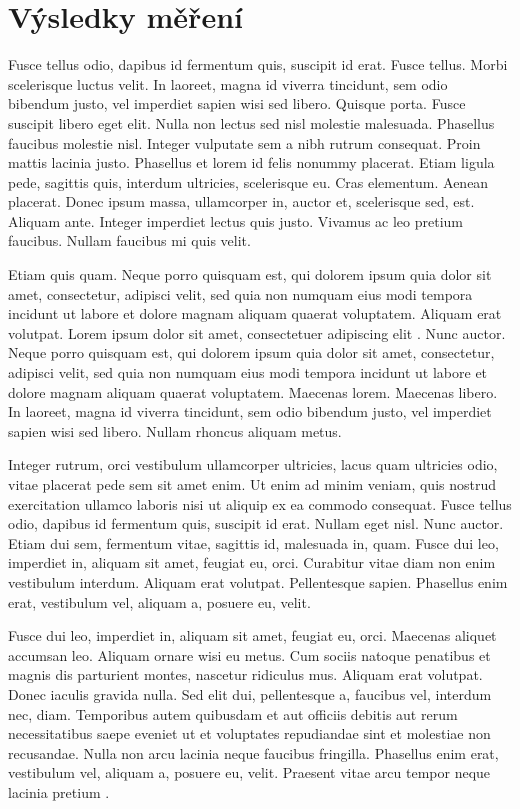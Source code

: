 \section{Výsledky měření}
Fusce tellus odio, dapibus id fermentum quis, suscipit id erat. Fusce tellus. Morbi scelerisque luctus velit. In laoreet, magna id viverra tincidunt, sem odio bibendum justo, vel imperdiet sapien wisi sed libero. Quisque porta. Fusce suscipit libero eget elit. Nulla non lectus sed nisl molestie malesuada. Phasellus faucibus molestie nisl. Integer vulputate sem a nibh rutrum consequat. Proin mattis lacinia justo. Phasellus et lorem id felis nonummy placerat. Etiam ligula pede, sagittis quis, interdum ultricies, scelerisque eu. Cras elementum. Aenean placerat. Donec ipsum massa, ullamcorper in, auctor et, scelerisque sed, est. Aliquam ante. Integer imperdiet lectus quis justo. Vivamus ac leo pretium faucibus. Nullam faucibus mi quis velit.

Etiam quis quam. Neque porro quisquam est, qui dolorem ipsum quia dolor sit amet, consectetur, adipisci velit, sed quia non numquam eius modi tempora incidunt ut labore et dolore magnam aliquam quaerat voluptatem. Aliquam erat volutpat. Lorem ipsum dolor sit amet, consectetuer adipiscing elit \cite{sr02/2009,pravidla}. Nunc auctor. Neque porro quisquam est, qui dolorem ipsum quia dolor sit amet, consectetur, adipisci velit, sed quia non numquam eius modi tempora incidunt ut labore et dolore magnam aliquam quaerat voluptatem. Maecenas lorem. Maecenas libero. In laoreet, magna id viverra tincidunt, sem odio bibendum justo, vel imperdiet sapien wisi sed libero. Nullam rhoncus aliquam metus.

Integer rutrum, orci vestibulum ullamcorper ultricies, lacus quam ultricies odio, vitae placerat pede sem sit amet enim. Ut enim ad minim veniam, quis nostrud exercitation ullamco laboris nisi ut aliquip ex ea commodo consequat. Fusce tellus odio, dapibus id fermentum quis, suscipit id erat. Nullam eget nisl. Nunc auctor. Etiam dui sem, fermentum vitae, sagittis id, malesuada in, quam. Fusce dui leo, imperdiet in, aliquam sit amet, feugiat eu, orci. Curabitur vitae diam non enim vestibulum interdum. Aliquam erat volutpat. Pellentesque sapien. Phasellus enim erat, vestibulum vel, aliquam a, posuere eu, velit.

Fusce dui leo, imperdiet in, aliquam sit amet, feugiat eu, orci. Maecenas aliquet accumsan leo. Aliquam ornare wisi eu metus. Cum sociis natoque penatibus et magnis dis parturient montes, nascetur ridiculus mus. Aliquam erat volutpat. Donec iaculis gravida nulla. Sed elit dui, pellentesque a, faucibus vel, interdum nec, diam. Temporibus autem quibusdam et aut officiis debitis aut rerum necessitatibus saepe eveniet ut et voluptates repudiandae sint et molestiae non recusandae. Nulla non arcu lacinia neque faucibus fringilla. Phasellus enim erat, vestibulum vel, aliquam a, posuere eu, velit. Praesent vitae arcu tempor neque lacinia pretium
\cite{Walter1999,Svacina1999IEEE,RajmicSysel2002}.

